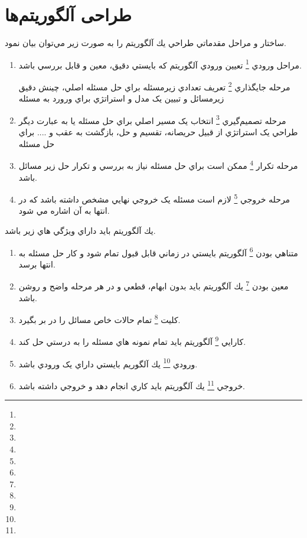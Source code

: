 \documentclass{book}
\begin{document}
\section*{طراحی آلگوریتم‌ها}
ساختار و مراحل مقدماتي طراحي يك آلگوريتم را به صورت زير مي‌توان بيان نمود.\\
\begin{enumerate}
	\item 
	مراحل ورودي 
	\footnote{}
	تعيين ورودي آلگوريتم که بايستي دقيق، معين و قابل بررسي باشد. 
	
	مرحله جايگذاري
		\footnote{}
	 تعريف تعدادي زيرمسئله براي حل مسئله اصلي، چينش دقيق زيرمسائل و تبيين يک مدل و استراتژي براي ورورد به مسئله
	\item 
	مرحله تصميم‌گيري 
		\footnote{}
	انتخاب يک مسير اصلي براي حل مسئله يا به عبارت ديگر طراحي يک استراتژي از قبيل حريصانه، تقسيم و حل، بازگشت به عقب و .... براي حل مسئله
	\item 
	مرحله تكرار 
		\footnote{}
	ممکن است براي حل مسئله نياز به بررسي و تکرار حل زير مسائل باشد.
	\item 
	مرحله خروجي 
		\footnote{}
	لازم است مسئله يک خروجي نهايي مشخص داشته باشد که در انتها به آن اشاره مي شود. 
\end{enumerate}
يك آلگوريتم بايد داراي ويژگي هاي زير باشد.
 \\
\begin{enumerate}
	\item 
	متناهي بودن 
			\footnote{}
	آلگوريتم بايستي در زماني قابل قبول تمام شود و کار حل مسئله به انتها برسد.  
	\item 
	معين بودن 
			\footnote{}
	يك آلگوريتم بايد بدون ابهام، قطعي و در هر مرحله واضح و روشن باشد.
		\item 
	كليت 
			\footnote{}
			تمام حالات خاص مسائل را در بر بگيرد.
		\item 
	كارايي
			\footnote{}
			 آلگوريتم بايد تمام نمونه هاي مسئله را به درستي حل کند.
		\item 
	ورودي 
			\footnote{}
			يك آلگوريم بايستي داراي يک ورودي باشد.
		\item 
	خروجي 
			\footnote{}
			يك آلگوريتم بايد كاري انجام دهد و خروجي داشته باشد.
\end{enumerate}
\end{document}
